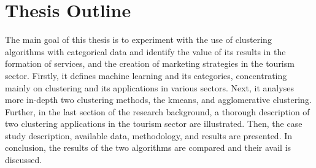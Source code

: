 \section{Thesis Outline}
The main goal of this thesis is to experiment with the use of clustering algorithms with categorical data and identify the value of its results in the formation of services, and the creation of marketing strategies in the tourism sector. Firstly, it defines machine learning and its categories, concentrating mainly on clustering and its applications in various sectors. Next, it analyses more in-depth two clustering methods, the kmeans, and agglomerative clustering. Further, in the last section of the research background, a thorough description of two clustering applications in the tourism sector are illustrated. Then, the case study description, available data, methodology, and results are presented. In conclusion, the results of the two algorithms are compared and their avail is discussed.